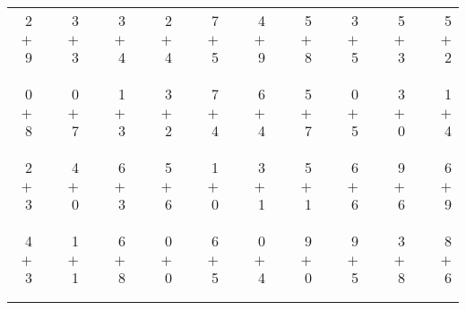 \documentclass[12pt, letterpaper]{article}
\begin{document}
\begin{tabular}{rrrrrrrrrrrrrrrrrrr}
2 & & 3 & & 3 & & 2 & & 7 & & 4 & & 5 & & 3 & & 5 & & 5\\
$+$ 9 & & $+$ 3 & & $+$ 4 & & $+$ 4 & & $+$ 5 & & $+$ 9 & & $+$ 8 & & $+$ 5 & & $+$ 3 & & $+$ 2\\
\cline{1-1} \cline{3-3} \cline{5-5} \cline{7-7} \cline{9-9} \cline{11-11} \cline{13-13} \cline{15-15} \cline{17-17} \cline{19-19} \\ \\
0 & & 0 & & 1 & & 3 & & 7 & & 6 & & 5 & & 0 & & 3 & & 1\\
$+$ 8 & & $+$ 7 & & $+$ 3 & & $+$ 2 & & $+$ 4 & & $+$ 4 & & $+$ 7 & & $+$ 5 & & $+$ 0 & & $+$ 4\\
\cline{1-1} \cline{3-3} \cline{5-5} \cline{7-7} \cline{9-9} \cline{11-11} \cline{13-13} \cline{15-15} \cline{17-17} \cline{19-19} \\ \\
2 & & 4 & & 6 & & 5 & & 1 & & 3 & & 5 & & 6 & & 9 & & 6\\
$+$ 3 & & $+$ 0 & & $+$ 3 & & $+$ 6 & & $+$ 0 & & $+$ 1 & & $+$ 1 & & $+$ 6 & & $+$ 6 & & $+$ 9\\
\cline{1-1} \cline{3-3} \cline{5-5} \cline{7-7} \cline{9-9} \cline{11-11} \cline{13-13} \cline{15-15} \cline{17-17} \cline{19-19} \\ \\
4 & & 1 & & 6 & & 0 & & 6 & & 0 & & 9 & & 9 & & 3 & & 8\\
$+$ 3 & & $+$ 1 & & $+$ 8 & & $+$ 0 & & $+$ 5 & & $+$ 4 & & $+$ 0 & & $+$ 5 & & $+$ 8 & & $+$ 6\\
\cline{1-1} \cline{3-3} \cline{5-5} \cline{7-7} \cline{9-9} \cline{11-11} \cline{13-13} \cline{15-15} \cline{17-17} \cline{19-19} \\ \\
\end{tabular}
\newpage
\end{document}
